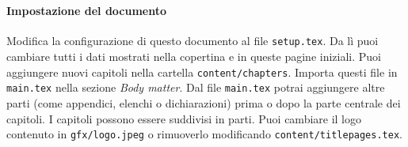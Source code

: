 %
~\label{sec:sommario}

\paragraph{Impostazione del documento}
Modifica la configurazione di questo documento al file \texttt{setup.tex}. Da lì puoi cambiare tutti i dati mostrati nella copertina e in queste pagine iniziali.
Puoi aggiungere nuovi capitoli nella cartella \texttt{content/chapters}. Importa questi file in \texttt{main.tex} nella sezione \textit{Body matter}.
Dal file \texttt{main.tex} potrai aggiungere altre parti (come appendici, elenchi o dichiarazioni) prima o dopo la parte centrale dei capitoli.
I capitoli possono essere suddivisi in parti. Puoi cambiare il logo contenuto in \texttt{gfx/logo.jpeg} o rimuoverlo modificando \texttt{content/titlepages.tex}.